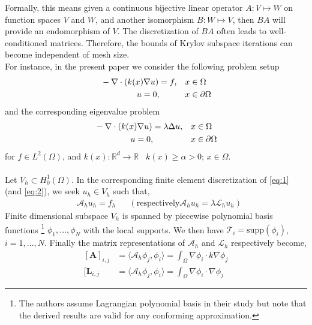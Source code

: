 Formally, this means given a continuous bijective linear operator $A : V \mapsto W$ on function spaces $V$ and $W$, and another isomorphism $B : W \mapsto V$, then $BA$ will provide an endomorphism of $V$. The discretization of $BA$ often leads to well-conditioned matrices. Therefore, the bounds of Krylov subspace iterations can become independent of mesh size.\\
For instance, in the present paper we consider the following problem setup
\begin{align}
  \label{eq:1}
& -\nabla\cdot(k(x)\nabla u) = f ,
& &x \in \Omega \\ \nonumber
&\hspace{1.5cm} u = 0, 
& &x \in \partial\Omega
\end{align}
and the corresponding eigenvalue problem 
\begin{align}
  \label{eq:2}
& -\nabla\cdot(k(x)\nabla u) = \lambda\Delta u ,
  & &x \in \Omega \\ \nonumber
&\hspace{1.5cm} u = 0, 
& &x \in \partial\Omega
\end{align}
for $f \in L^2(\Omega)$, and $k(x):\mathbb{R}^d \rightarrow \mathbb{R}$ \
$k(x)\geq \alpha > 0$; $x \in \Omega$. \\\\
Let $V_{h} \subset H_{0}^1(\Omega)$. In the corresponding finite element discretization of \eqref{eq:1} (and \eqref{eq:2}), we seek $u_{h} \in V_{h}$ such that,
\begin{align}
& \mathcal{A}_{h}u_{h} = f_{h} 
& & (\text{respectively} \mathcal{A}_{h}u_{h} = \lambda\mathcal{L}_{h}u_{h})
\end{align}
Finite dimensional subspace $V_{h}$ is spanned by piecewise polynomial basis functions \footnote{The authors assume Lagrangian polynomial basis in their study but note that the derived results are valid for any conforming approximation.} $\phi_1,\dots,\phi_N$ with the local supports. We then have $\mathcal{T}_i = \text{supp}(\phi_i)$, $i=1,\dots,N$.
Finally the matrix representations of $\mathcal{A}_{h}$ and $\mathcal{L}_{h}$ respectively become,
\begin{align}
  \label{eq:4}
[\mathbf{A}]_{i,j} &= \langle\mathcal{A}_{h}\phi_{j},\phi_{i}\rangle  =\int_{\Omega} \nabla\phi_i\cdot k\nabla\phi_j \\
[\mathbf{L}_{i,j} &= \langle\mathcal{A}_{h}\phi_{j},\phi_{i}\rangle = \int_{\Omega} \nabla\phi_i\cdot \nabla\phi_j
\end{align}

